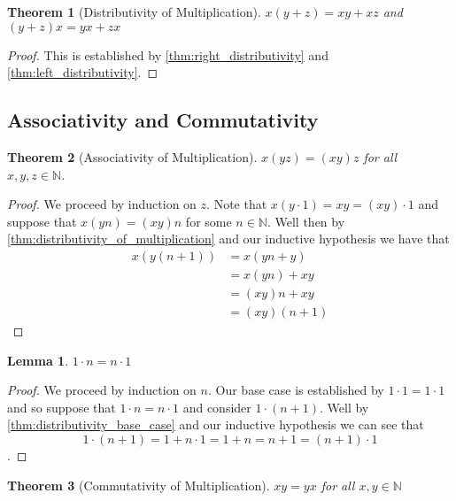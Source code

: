 \documentclass{article}
\theoremstyle{definition}
\theoremstyle{definition}
\theoremstyle{plain}
\theoremstyle{remark}
\theoremstyle{plain}
\newtheorem{theorem}{Theorem}[section]
\theoremstyle{remark}
\theoremstyle{plain}
\newtheorem{lemma}{Lemma}[section]
\theoremstyle{plain}
\theoremstyle{plain}
\theoremstyle{plain}
\begin{document}
\begin{theorem}[Distributivity of Multiplication]
  \(x(y + z) = xy + xz \) and \( (y+z)x = yx + zx \) 
  \label{thm:distributivity_of_multiplication}
\end{theorem}

\begin{proof}
  This is established by \autoref{thm:right_distributivity} and
  \autoref{thm:left_distributivity}. 
\end{proof}

\subsection{Associativity and Commutativity}


\begin{theorem}[Associativity of Multiplication]
   \(x(yz) = (xy)z\) for all \( x, y, z \in \mathbb{N} \). 
\end{theorem}

\begin{proof}
  We proceed by induction on \( z \). Note that 
  \( x(y \cdot 1 ) = xy = (x y) \cdot 1 \) and suppose that 
  \( x(yn) = (xy)n \) for some \( n \in \mathbb{N}  \). Well then 
  by \autoref{thm:distributivity_of_multiplication} and our inductive hypothesis
  we have that
  \begin{align*}
    x(y(n+1)) &= x(yn+y) \\
              &= x(yn) + xy \\
              &= (xy)n + xy \\
              &= (xy)(n+1)
  \end{align*}
\end{proof}

\begin{lemma}
  \( 1 \cdot n = n \cdot 1 \)
  \label{thm:commutativity_lemma}
\end{lemma}

\begin{proof}
  We proceed by induction on \( n \). Our base case is established by 
  \( 1 \cdot 1 = 1 \cdot 1\) and so suppose that \( 1 \cdot n = n \cdot 1 \) and
  consider \( 1 \cdot (n + 1) \). Well by \autoref{thm:distributivity_base_case}
  and our inductive hypothesis we can see that 
  \[ 1 \cdot (n + 1) = 1 + n \cdot 1 = 1 + n = n + 1 = (n + 1) \cdot 1 \].
\end{proof}

\begin{theorem}[Commutativity of Multiplication]
  \( xy = yx \) for all \( x, y \in \mathbb{N} \) 
\end{theorem}
\end{document}
